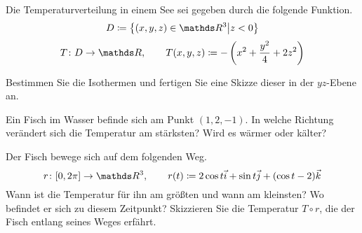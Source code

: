 \begin{atiTask}[
  title = Wie ein Fisch im Wasser
]
  Die Temperaturverteilung in einem See sei gegeben durch die folgende Funktion.
  \[
    D \define \left\{ (x,y,z)\in\setR^3 \middle| z < 0 \right\}
  \]
  \[
    \function{T}{D}{\setR}
    \separate
    T(x,y,z)\define -\curvb{x^2 + \frac{y^2}{4} + 2z^2}
  \]
  \begin{atiSubtasks}
    \item{
      Bestimmen Sie die Isothermen und fertigen Sie eine Skizze dieser in der $yz$-Ebene an.
    }
    \item{
      Ein Fisch im Wasser befinde sich am Punkt $(1,2,-1)$.
      In welche Richtung verändert sich die Temperatur am stärksten?
      Wird es wärmer oder kälter?
    }
    \item{
      Der Fisch bewege sich auf dem folgenden Weg.
      \[
        \function{r}{[0,2\pi]}{\setR^3}
        \separate
        r(t)\define 2\cos t \vec{i} + \sin t \vec{j} + (\cos t - 2)\vec{k}
      \]
      Wann ist die Temperatur für ihn am größten und wann am kleinsten?
      Wo befindet er sich zu diesem Zeitpunkt?
      Skizzieren Sie die Temperatur $T\circ r$, die der Fisch entlang seines Weges erfährt.
    }
  \end{atiSubtasks}
\end{atiTask}